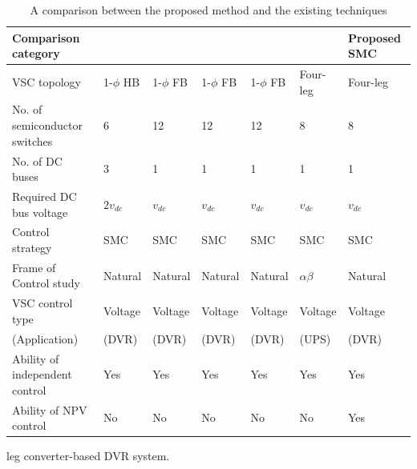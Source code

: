\begin{landscape}
\begin{table}[t!] 
	\centering
	\setlength\extrarowheight{2pt}
	\caption{A comparison between the proposed method and the existing techniques} 
	\label{Table5.3}
	\begin{tabular}{>{\small }l>{\small }l>{\small }l>{\small }l>{\small }l>{\small }l>{\small }l}  
		\hline
		\hline
		\textbf{Comparison category} & \textbf{ \cite{7776961}} & \textbf{ \cite{9264672}} & \textbf{\cite{7506128}} & \textbf{\cite{8466115}}  & \textbf{\cite{7884971}} & \textbf{ Proposed SMC} \\
		\hline
		VSC topology & 1-$\phi$ HB & 1-$\phi$ FB & 1-$\phi$ FB & 1-$\phi$ FB & Four-leg & Four-leg \\
		\hline
		No. of semiconductor switches & 6 & 12 & 12 & 12 & 8 & 8  \\ 
		\hline
		No. of DC buses  & 3 & 1 & 1 & 1 & 1 & 1  \\ 
		\hline
		Required DC bus voltage  & $2v_{dc}$ & $v_{dc}$ & $v_{dc}$ & $v_{dc}$ & $v_{dc}$ & $v_{dc}$  \\ 
		\hline
		Control strategy & SMC & SMC & SMC & SMC & SMC & SMC \\
		\hline
		Frame of Control study  & Natural & Natural & Natural & Natural & $\alpha\beta$ & Natural \\
		\hline
		VSC control type   &  Voltage & Voltage & Voltage & Voltage & Voltage & Voltage \\
		(Application)   &  (DVR) & (DVR) & (DVR) & (DVR) & (UPS) & (DVR) \\
		\hline
		Ability of independent control  &  Yes & Yes & Yes & Yes & Yes & Yes \\  \hline
		Ability of NPV control  &  No & No & No & No & No & Yes \\  
		\hline
		\hline 
	\end{tabular}  
\end{table} 
\end{landscape}  
leg converter-based DVR system.

